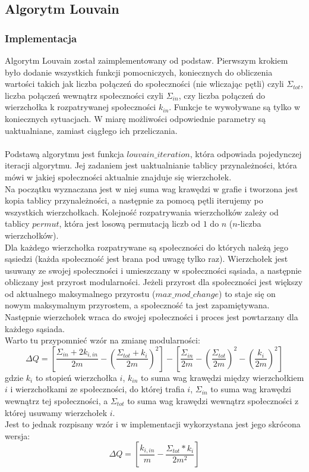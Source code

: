 \documentclass{article}
\begin{document}
\subsection{Algorytm Louvain}

\subsubsection{Implementacja}
Algorytm Louvain został zaimplementowany od podstaw. Pierwszym krokiem było dodanie wszystkich funkcji pomocniczych, koniecznych do obliczenia wartości takich jak liczba połączeń do społeczności (nie wliczając pętli) czyli $\Sigma_{tot}$, liczba połączeń wewnątrz społeczności czyli $\Sigma_{in}$, czy liczba połączeń do wierzchołka k rozpatrywanej społeczności $k_{in}$. Funkcje te wywoływane są tylko w koniecznych sytuacjach. W miarę możliwości odpowiednie parametry są uaktualniane, zamiast ciągłego ich przeliczania.\\ \\
Podstawą algorytmu jest funkcja $louvain\_ iteration$, która odpowiada pojedynczej iteracji algorytmu. Jej zadaniem jest uaktualnianie tablicy przynależności, która mówi w jakiej społeczności aktualnie znajduje się wierzchołek.\\ Na początku wyznaczana jest w niej suma wag krawędzi w grafie i tworzona jest kopia tablicy przynależności, a następnie za pomocą pętli iterujemy po wszystkich wierzchołkach. Kolejność rozpatrywania wierzchołków zależy od tablicy $permut$, która jest losową permutacją liczb od $1$ do $n$ ($n$-liczba wierzchołków). \\Dla każdego wierzchołka rozpatrywane są społeczności do których należą jego sąsiedzi (każda społeczność jest brana pod uwagę tylko raz). Wierzchołek jest usuwany ze swojej społeczności i umieszczany w społeczności sąsiada, a następnie obliczany jest przyrost modularności. Jeżeli przyrost dla społeczności jest większy od aktualnego maksymalnego przyrostu ($max\_ mod\_ change$) to staje się on nowym maksymalnym przyrostem, a społeczność ta jest zapamiętywana. Następnie wierzchołek wraca do swojej społeczności i proces jest powtarzany dla każdego sąsiada. \\
Warto tu przypomnieć wzór na zmianę modularności: $$\Delta Q = [\frac{\Sigma_{in} +2k_{i,in}}{2m} - (\frac{\Sigma_{tot} + k_i}{2m})^2] - [\frac{\Sigma_{in}}{2m} - (\frac{\Sigma_{tot}}{2m})^2 - (\frac{k_i}{2m})^2]$$ gdzie $k_i$ to stopień wierzchołka $i$, $k_{in}$ to suma wag krawędzi między wierzchołkiem $i$ i wierzchołkami ze społeczności, do której trafia $i$, $\Sigma_{in}$ to suma wag krawędzi wewnątrz tej społeczności, a $\Sigma_{tot}$ to suma wag krawędzi wewnątrz społeczności z której usuwamy wierzchołek $i$.\\Jest to jednak rozpisany wzór i w implementacji wykorzystana jest jego skrócona wersja: $$\Delta Q = [\frac{k_{i,in}}{m} - \frac{\Sigma_{tot}*k_i}{2m^2}]$$ \\
\end{document}
